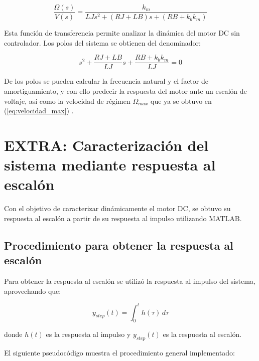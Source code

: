\documentclass[letter,12pt]{article}
\begin{document}
\begin{equation}
	\frac{\Omega(s)}{V(s)} = \frac{k_m}{L J s^2 + (R J + L B)s + (R B + k_b k_m)}
	\label{eq:ft_motor}
\end{equation}

Esta función de transferencia permite analizar la dinámica del motor DC sin controlador. Los polos del sistema se obtienen del denominador:

\begin{equation}
	s^2 + \frac{R J + L B}{L J} s + \frac{R B + k_b k_m}{L J} = 0
\end{equation}

De los polos se pueden calcular la frecuencia natural y el factor de amortiguamiento, y con ello predecir la respuesta del motor ante un escalón de voltaje, así como la velocidad de régimen $\Omega_{max}$ que ya se obtuvo en (\ref{eq:velocidad_max}) \cite{zaccarian_dc_motors}.

\newpage

\section{EXTRA: Caracterización del sistema mediante respuesta al escalón}

Con el objetivo de caracterizar dinámicamente el motor DC, se obtuvo su respuesta al escalón a partir de su respuesta al impulso utilizando MATLAB.

\subsection{Procedimiento para obtener la respuesta al escalón}

Para obtener la respuesta al escalón se utilizó la respuesta al impulso del sistema, aprovechando que:

\begin{equation}
	y_{step}(t) = \int_{0}^{t} h(\tau)\, d\tau
\end{equation}

donde $h(t)$ es la respuesta al impulso y $y_{step}(t)$ es la respuesta al escalón.

El siguiente pseudocódigo muestra el procedimiento general implementado:
\end{document}

